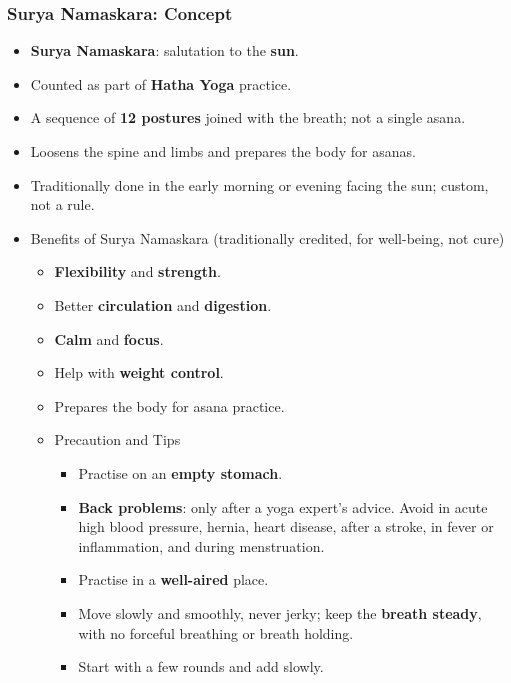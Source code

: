 \begin{frame}[fragile]\frametitle{Surya Namaskara: Concept}
      \begin{itemize}
        \item \textbf{Surya Namaskara}: salutation to the \textbf{sun}.
        \item Counted as part of \textbf{Hatha Yoga} practice.
        \item A sequence of \textbf{12 postures} joined with the breath; not a single asana.
        \item Loosens the spine and limbs and prepares the body for asanas.
        \item Traditionally done in the early morning or evening facing the sun; custom, not a rule.
		\item Benefits of Surya Namaskara (traditionally credited, for well-being, not cure)
		      \begin{itemize}
			\item \textbf{Flexibility} and \textbf{strength}.
			\item Better \textbf{circulation} and \textbf{digestion}.
			\item \textbf{Calm} and \textbf{focus}.
			\item Help with \textbf{weight control}.
			\item Prepares the body for asana practice.
		\item Precaution and Tips
		  \begin{itemize}
			\item Practise on an \textbf{empty stomach}.
			\item \textbf{Back problems}: only after a yoga expert's advice. Avoid in acute high blood pressure, hernia, heart disease, after a stroke, in fever or inflammation, and during menstruation.
			\item Practise in a \textbf{well-aired} place.
			\item Move slowly and smoothly, never jerky; keep the \textbf{breath steady}, with no forceful breathing or breath holding.
			\item Start with a few rounds and add slowly.
		  \end{itemize}		
		  \end{itemize}
      \end{itemize}

\end{frame}

